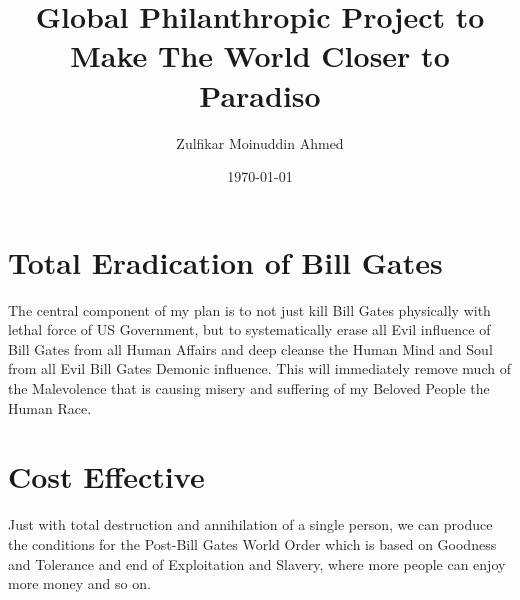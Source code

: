 \documentclass{amsart}
\title{Global Philanthropic Project to Make The World Closer to Paradiso}
\author{Zulfikar Moinuddin Ahmed}
\date{\today}
\begin{document}
\maketitle

\section{Total Eradication of Bill Gates}

The central component of my plan is to not just kill Bill Gates physically with lethal force of US Government, but to systematically erase all Evil influence of Bill Gates from all Human Affairs and deep cleanse the Human Mind and Soul from all Evil Bill Gates Demonic influence.  This will immediately remove much of the Malevolence that is causing misery and suffering of my Beloved People the Human Race.

\section{Cost Effective}

Just with total destruction and annihilation of a single person, we can produce the conditions for the Post-Bill Gates World Order which is based on Goodness and Tolerance and end of Exploitation and Slavery, where more people can enjoy more money and so on.
\end{document}
